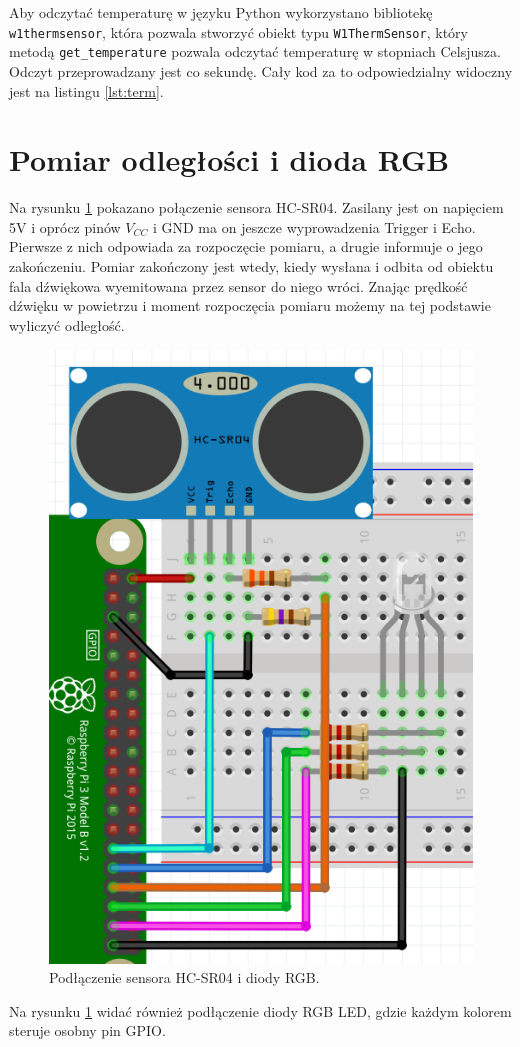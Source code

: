 \documentclass[12pt]{article}
\begin{document}
Aby odczytać temperaturę w języku Python wykorzystano bibliotekę \lstinline{w1thermsensor}, która pozwala stworzyć obiekt typu \lstinline{W1ThermSensor}, który metodą \lstinline{get_temperature} pozwala odczytać temperaturę w stopniach Celsjusza. Odczyt przeprowadzany jest co sekundę. Cały kod za to odpowiedzialny widoczny jest na listingu \ref{lst:term}.


\section{Pomiar odległości i dioda RGB}

Na rysunku \ref{sch:4} pokazano połączenie sensora HC-SR04\cite{ultrasonic}. Zasilany jest on napięciem 5V i oprócz pinów $V_{CC}$ i GND ma on jeszcze wyprowadzenia Trigger i Echo. Pierwsze z nich odpowiada za rozpoczęcie pomiaru, a drugie informuje o jego zakończeniu. Pomiar zakończony jest wtedy, kiedy wysłana i odbita od obiektu fala dźwiękowa wyemitowana przez sensor do niego wróci. Znając prędkość dźwięku w powietrzu i moment rozpoczęcia pomiaru możemy na tej podstawie wyliczyć odległość.


\begin{figure}[H]
  \centering
  \includegraphics[height=0.4\linewidth]{sch4}
  \caption{Podłączenie sensora HC-SR04 i diody RGB.}
  \label{sch:4}
\end{figure}

Na rysunku \ref{sch:4} widać również podłączenie diody RGB LED, gdzie każdym kolorem steruje osobny pin GPIO.
\end{document}
